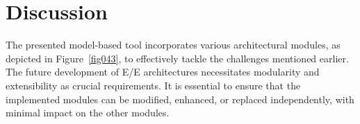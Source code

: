     \section{Discussion}
    
    The presented model-based tool incorporates various architectural modules, as depicted in Figure~\ref{fig043}, to effectively tackle the challenges mentioned earlier. The future development of E/E architectures necessitates modularity and extensibility as crucial requirements. It is essential to ensure that the implemented modules can be modified, enhanced, or replaced independently, with minimal impact on the other modules.

